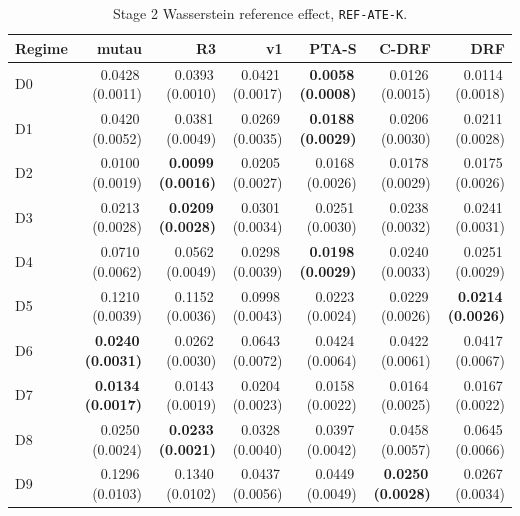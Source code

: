 \begin{table}[htbp]
\centering
\caption{Stage 2 Wasserstein reference effect, \texttt{REF-ATE-K}.}
\label{tab:p55s2-refate}
\scriptsize
\setlength{\tabcolsep}{3.2pt}
\begin{tabular}{@{}lrrrrrr@{}}
\toprule
Regime & mutau & R3 & v1 & PTA-S & C-DRF & DRF \\
\midrule
D0 & 0.0428\,(0.0011) & 0.0393\,(0.0010) & 0.0421\,(0.0017) & \textbf{0.0058\,(0.0008)} & 0.0126\,(0.0015) & 0.0114\,(0.0018) \\
D1 & 0.0420\,(0.0052) & 0.0381\,(0.0049) & 0.0269\,(0.0035) & \textbf{0.0188\,(0.0029)} & 0.0206\,(0.0030) & 0.0211\,(0.0028) \\
D2 & 0.0100\,(0.0019) & \textbf{0.0099\,(0.0016)} & 0.0205\,(0.0027) & 0.0168\,(0.0026) & 0.0178\,(0.0029) & 0.0175\,(0.0026) \\
D3 & 0.0213\,(0.0028) & \textbf{0.0209\,(0.0028)} & 0.0301\,(0.0034) & 0.0251\,(0.0030) & 0.0238\,(0.0032) & 0.0241\,(0.0031) \\
D4 & 0.0710\,(0.0062) & 0.0562\,(0.0049) & 0.0298\,(0.0039) & \textbf{0.0198\,(0.0029)} & 0.0240\,(0.0033) & 0.0251\,(0.0029) \\
D5 & 0.1210\,(0.0039) & 0.1152\,(0.0036) & 0.0998\,(0.0043) & 0.0223\,(0.0024) & 0.0229\,(0.0026) & \textbf{0.0214\,(0.0026)} \\
D6 & \textbf{0.0240\,(0.0031)} & 0.0262\,(0.0030) & 0.0643\,(0.0072) & 0.0424\,(0.0064) & 0.0422\,(0.0061) & 0.0417\,(0.0067) \\
D7 & \textbf{0.0134\,(0.0017)} & 0.0143\,(0.0019) & 0.0204\,(0.0023) & 0.0158\,(0.0022) & 0.0164\,(0.0025) & 0.0167\,(0.0022) \\
D8 & 0.0250\,(0.0024) & \textbf{0.0233\,(0.0021)} & 0.0328\,(0.0040) & 0.0397\,(0.0042) & 0.0458\,(0.0057) & 0.0645\,(0.0066) \\
D9 & 0.1296\,(0.0103) & 0.1340\,(0.0102) & 0.0437\,(0.0056) & 0.0449\,(0.0049) & \textbf{0.0250\,(0.0028)} & 0.0267\,(0.0034) \\
\bottomrule
\end{tabular}
\end{table}

